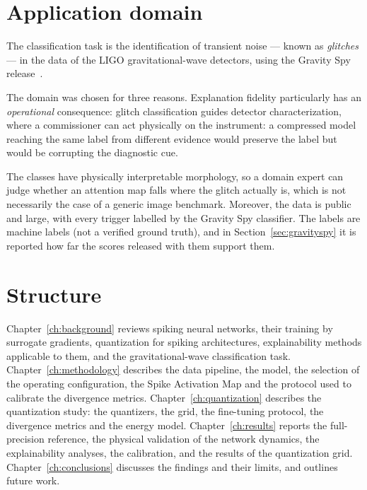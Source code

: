 \section{Application domain}

The classification task is the identification of transient noise --- known as
\emph{glitches} --- in the data of the LIGO gravitational-wave detectors, using
the Gravity Spy release~\cite{zevin2017, glanzer2023, glanzer2021}.

The domain was chosen for three reasons. Explanation fidelity particularly has an
\emph{operational} consequence: glitch classification guides detector
characterization, where a commissioner can act physically on the instrument: a
compressed model reaching the same label from different evidence would preserve
the label but would be corrupting the diagnostic cue.

The classes have physically
interpretable morphology, so a domain expert can judge whether an attention map
falls where the glitch actually is, which is not necessarily the case of a generic image
benchmark. Moreover, the data is public and large, with every trigger labelled by the
Gravity Spy classifier. The labels are machine labels (not a verified
ground truth), and in Section~\ref{sec:gravityspy} it is reported how far the scores 
released with them support them.

\section{Structure}

Chapter~\ref{ch:background} reviews spiking neural networks, their training by
surrogate gradients, quantization for spiking architectures, explainability
methods applicable to them, and the gravitational-wave classification task.
Chapter~\ref{ch:methodology} describes the data pipeline, the model, the
selection of the operating configuration, the Spike Activation Map and the
protocol used to calibrate the divergence metrics.
Chapter~\ref{ch:quantization} describes the quantization study: the quantizers,
the grid, the fine-tuning protocol, the divergence metrics and the energy model.
Chapter~\ref{ch:results} reports the full-precision reference, the physical
validation of the network dynamics, the explainability analyses, the
calibration, and the results of the quantization grid.
Chapter~\ref{ch:conclusions} discusses the findings and their limits, and
outlines future work.